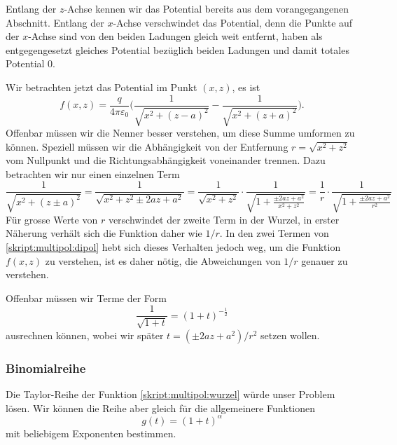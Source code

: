 Entlang der $z$-Achse kennen wir das Potential bereits aus
dem vorangegangenen Abschnitt.
Entlang der $x$-Achse verschwindet das Potential, denn die Punkte
auf der $x$-Achse sind von den beiden Ladungen gleich weit entfernt,
haben als entgegengesetzt gleiches Potential bezüglich beiden Ladungen
und damit totales Potential 0.

Wir betrachten jetzt das Potential im Punkt $(x,z)$, es ist
\begin{equation}
f(x,z)
=
\frac{q}{4\pi\varepsilon_0}
\biggl(
\frac{1}{\sqrt{x^2 + (z-a)^2}}
-
\frac{1}{\sqrt{x^2 + (z+a)^2}}
\biggr).
\label{skript:multipol:dipol}
\end{equation}
Offenbar müssen wir die Nenner besser verstehen, um diese Summe 
umformen zu können.
Speziell müssen wir die Abhängigkeit von der Entfernung
$r=\sqrt{x^2+z^2}$ vom Nullpunkt
und die Richtungsabhängigkeit voneinander trennen.
Dazu betrachten wir nur einen einzelnen Term
\[
\frac{1}{\sqrt{x^2+(z\pm a)^2}}
=
\frac{1}{\sqrt{x^2+z^2\pm 2az+a^2}}
=
\frac{1}{\sqrt{x^2+z^2}} \cdot \frac{1}{\sqrt{1+\frac{\pm 2az+a^2}{x^2+z^2}}}
=
\frac{1}{r} \cdot \frac{1}{\sqrt{1+\frac{\pm 2az+a^2}{r^2}}}
\]
Für grosse Werte von $r$ verschwindet der zweite Term in der Wurzel,
in erster Näherung verhält sich die Funktion daher wie $1/r$.
In den zwei Termen von \eqref{skript:multipol:dipol} hebt sich dieses
Verhalten jedoch weg, um die Funktion $f(x,z)$ zu verstehen, ist es
daher nötig, die Abweichungen von $1/r$ genauer zu verstehen.

Offenbar müssen wir Terme der Form
\begin{equation}
\frac{1}{\sqrt{1+t}}
=
(1+t)^{-\frac12}
\label{skript:multipol:wurzel}
\end{equation}
ausrechnen können, wobei wir später $t=(\pm2az+a^2)/r^2$ setzen wollen.

\subsubsection{Binomialreihe}
Die Taylor-Reihe der Funktion \eqref{skript:multipol:wurzel}
würde unser Problem lösen. 
Wir können die Reihe aber gleich für die
allgemeinere Funktionen
\begin{equation}
g(t)=(1+t)^\alpha
\end{equation}
mit beliebigem Exponenten bestimmen.

